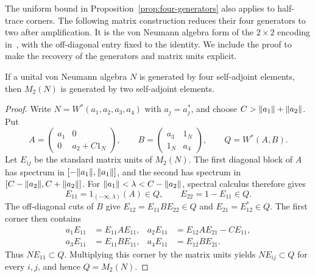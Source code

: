 The uniform bound in Proposition~\ref{prop:four-generators} also applies
to half-trace corners. The following matrix construction reduces their
four generators to two after amplification. It is the von Neumann algebra
form of the $2\times2$ encoding in~\cite[Proposition~1.1]{DSSW2008},
with the off-diagonal entry fixed to the identity. We include the proof
to make the recovery of the generators and matrix units explicit.

\begin{lemma}
\label{lem:matrix-encoding}
If a unital von Neumann algebra $N$ is generated by four
self-adjoint elements, then $M_2(N)$ is generated by two
self-adjoint elements.
\end{lemma}

\begin{proof}
Write $N=W^*(a_1,a_2,a_3,a_4)$ with $a_j=a_j^*$, and choose
$C>\lVert a_1\rVert+\lVert a_2\rVert$. Put
\[
 A=\begin{pmatrix}a_1&0\\0&a_2+C1_N\end{pmatrix},\qquad
 B=\begin{pmatrix}a_3&1_N\\1_N&a_4\end{pmatrix},\qquad
 Q=W^*(A,B).
\]
Let $E_{ij}$ be the standard matrix units of $M_2(N)$.
The first diagonal block of $A$ has spectrum in
$[-\lVert a_1\rVert,\lVert a_1\rVert]$, and the second has spectrum in
$[C-\lVert a_2\rVert,C+\lVert a_2\rVert]$. For
$\lVert a_1\rVert<\lambda<C-\lVert a_2\rVert$, spectral calculus therefore gives
\[
 E_{11}=1_{(-\infty,\lambda)}(A)\in Q,
 \qquad E_{22}=1-E_{11}\in Q.
\]
The off-diagonal cuts of $B$ give
$E_{12}=E_{11}BE_{22}\in Q$ and $E_{21}=E_{12}^*\in Q$.
The first corner then contains
\begin{align*}
 a_1E_{11}&=E_{11}AE_{11},&
 a_2E_{11}&=E_{12}AE_{21}-CE_{11},\\
 a_3E_{11}&=E_{11}BE_{11},&
 a_4E_{11}&=E_{12}BE_{21}.
\end{align*}
Thus $NE_{11}\subset Q$. Multiplying this corner by the matrix
units yields $NE_{ij}\subset Q$ for every $i,j$, and hence
$Q=M_2(N)$.
\end{proof}

